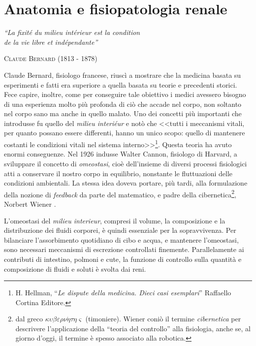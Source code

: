 \chapter{Anatomia e fisiopatologia renale}
 
\begin{flushright}
\textit{``La fixité du milieu intérieur est la condition \\de la vie libre et indépendante''}
\end{flushright}
\begin{flushright} \textsc{Claude Bernard} (1813 - 1878) \end{flushright}
\begin{flushright} { } \end{flushright}
Claude Bernard, fisiologo francese, riuscì a mostrare che la medicina basata su esperimenti e fatti era superiore a quella basata su teorie e precedenti storici. Fece capire, inoltre, come per conseguire tale obiettivo i medici avessero bisogno di una esperienza molto più profonda di ciò che accade nel corpo, non soltanto nel corpo sano ma anche in quello malato. Uno dei concetti più importanti che introdusse fu quello del \textit{milieu interiéur} e notò che <<tutti i meccanismi vitali, per quanto possano essere differenti, hanno un unico scopo: quello di mantenere costanti le condizioni vitali nel sistema interno>>\footnote{H. Hellman, ``\textit{Le dispute della medicina. Dieci casi esemplari}'' Raffaello Cortina Editore.}.
Questa teoria ha avuto enormi conseguenze. Nel 1926 indusse Walter Cannon, fisiologo di Harvard, a sviluppare il concetto di \textit{omeostasi}, cioè dell'insieme di diversi processi fisiologici atti a conservare il nostro corpo in equilibrio, nonstante le fluttuazioni delle condizioni ambientali. La stessa idea doveva portare, più tardi, alla formulazione della nozione di \textit{feedback} da parte del matematico, e padre della cibernetica\footnote{dal greco $\kappa\upsilon\beta\varepsilon\rho\nu\acute{\eta}\tau\eta\varsigma$ (timoniere). Wiener coniò il termine \textit{cibernetica} per descrivere l'applicazione della ``teoria del controllo'' alla fisiologia, anche se, al giorno d'oggi, il termine è spesso associato alla robotica.}, Norbert Wiener \cite{khoo}.

L'omeostasi del \textit{milieu interieur}, compresi il volume, la composizione e la distribuzione dei fluidi corporei, è quindi essenziale per la sopravvivenza. Per bilanciare l'assorbimento quotidiano di cibo e acqua, e mantenere l'omeostasi, sono necessari meccanismi di escrezione controllati finemente. Parallelamente ai contributi di intestino, polmoni e cute, la funzione di controllo sulla quantità e composizione di fluidi e soluti è svolta dai reni.

